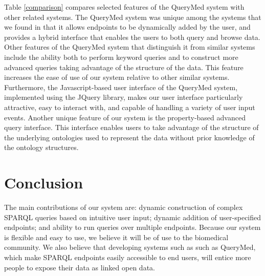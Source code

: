 \documentclass{www2010-submission}
\begin{document}
Table \ref{comparison} compares selected features of the QueryMed system with other related systems. The QueryMed system was unique among the systems that we found in that it allows endpoints to be dynamically added by the user, and provides a hybrid interface that enables the users to both query and browse data.  Other features of the QueryMed system that distinguish it from similar systems include the ability both to perform keyword queries and to construct more advanced queries taking advantage of the structure of the data.  This feature increases the ease of use of our system relative to other similar systems.  Furthermore, the Javascript-based user interface of the QueryMed system, implemented using the JQuery library, makes our user interface particularly attractive, easy to interact with, and capable of handling a variety of user input events.  Another unique feature of our system is the property-based advanced query interface. This interface enables users to take advantage of the structure of the underlying ontologies used to represent the data without prior knowledge of the ontology structures. 

\section{Conclusion}
\label{conclusion}

The main contributions of our system are: dynamic construction of complex SPARQL queries based on intuitive user input; dynamic addition of user-specified endpoints; and ability to run queries over multiple endpoints. Because our system is flexible and easy to use, we believe it will be of use to the biomedical community.  We also believe that developing systems such as such as QueryMed, which make SPARQL endpoints  easily accessible to end users, will entice more people to expose their data as linked open data.



  
\end{document}
